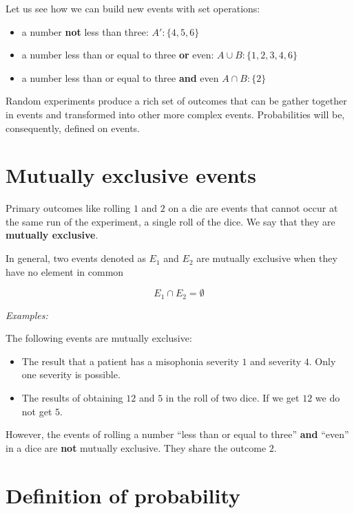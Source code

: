 \documentclass[
]{book}
\providecommand{\tightlist}{%
  \setlength{\itemsep}{0pt}\setlength{\parskip}{0pt}}
\begin{document}
Let us see how we can build new events with set operations:

\begin{itemize}
\tightlist
\item
  a number \textbf{not} less than three: \(A':\{4,5,6\}\)
\item
  a number less than or equal to three \textbf{or} even: \(A \cup B: \{ 1,2,3,4,6\}\)
\item
  a number less than or equal to three \textbf{and} even \(A \cap B: \{ 2\}\)
\end{itemize}

Random experiments produce a rich set of outcomes that can be gather together in events and transformed into other more complex events. Probabilities will be, consequently, defined on events.

\hypertarget{mutually-exclusive-events}{%
\section{Mutually exclusive events}\label{mutually-exclusive-events}}

Primary outcomes like rolling \(1\) and \(2\) on a die are events that cannot occur at the same run of the experiment, a single roll of the dice. We say that they are \textbf{mutually exclusive}.

In general, two events denoted as \(E_1\) and \(E_2\) are mutually exclusive when they have no element in common

\[E_1\cap E_2=\emptyset\]

\emph{Examples:}

The following events are mutually exclusive:

\begin{itemize}
\item
  The result that a patient has a misophonia severity \(1\) and severity \(4\). Only one severity is possible.
\item
  The results of obtaining \(12\) and \(5\) in the roll of two dice. If we get \(12\) we do not get \(5\).
\end{itemize}

However, the events of rolling a number ``less than or equal to three'' \textbf{and} ``even'' in a dice are \textbf{not} mutually exclusive. They share the outcome \(2\).

\hypertarget{definition-of-probability}{%
\section{Definition of probability}\label{definition-of-probability}}
\end{document}
